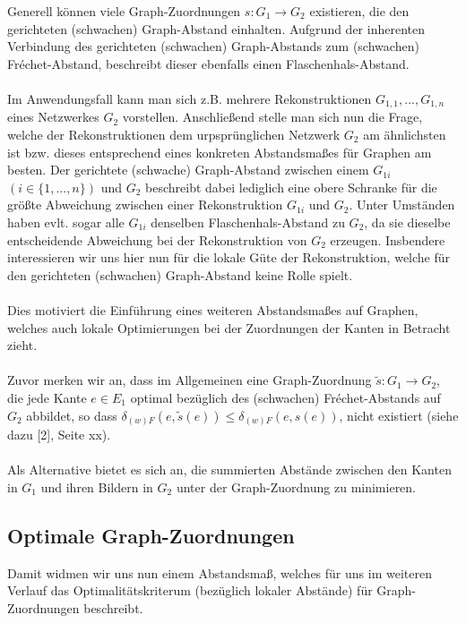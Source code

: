 \documentclass[a4paper, 12pt, twoside]{article}
\theoremstyle{Format1} %
\begin{document}
Generell können viele Graph-Zuordnungen $s: G_1 \to G_2$ existieren, die den gerichteten (schwachen) Graph-Abstand einhalten.
Aufgrund der inherenten Verbindung des gerichteten (schwachen) Graph-Abstands zum (schwachen) Fréchet-Abstand, beschreibt dieser ebenfalls einen Flaschenhals-Abstand.
\\
\\
Im Anwendungsfall kann man sich z.B. mehrere Rekonstruktionen $G_{1,1}, ..., G_{1,n}$ eines Netzwerkes $G_2$ vorstellen.
Anschließend stelle man sich nun die Frage, welche der Rekonstruktionen dem urpsprünglichen Netzwerk $G_2$ am ähnlichsten ist bzw. dieses entsprechend eines konkreten Abstandsmaßes
für Graphen am besten.
Der gerichtete (schwache) Graph-Abstand zwischen einem $G_{1i}$ $(i \in \{1,...,n\})$ und $G_2$ beschreibt dabei lediglich eine obere Schranke für die größte Abweichung zwischen
einer Rekonstruktion $G_{1i}$ und $G_2$.
Unter Umständen haben evlt. sogar alle $G_{1i}$ denselben Flaschenhals-Abstand zu $G_2$, da sie dieselbe entscheidende Abweichung bei der Rekonstruktion von $G_2$ erzeugen.
Insbendere interessieren wir uns hier nun für die lokale Güte der Rekonstruktion, welche für den gerichteten (schwachen) Graph-Abstand keine Rolle spielt.
\\
\\
Dies motiviert die Einführung eines weiteren Abstandsmaßes auf Graphen, welches auch lokale Optimierungen bei der Zuordnungen der Kanten in Betracht zieht.
\\
\\
Zuvor merken wir an, dass im Allgemeinen eine Graph-Zuordnung $\tilde{s}: G_1 \to G_2$, die jede Kante $e \in E_1$ optimal bezüglich des (schwachen)
Fréchet-Abstands auf $G_2$ abbildet, so dass $\delta_{(w)F}(e, \tilde{s}(e)) \leq \delta_{(w)F}(e, s(e))$, nicht existiert (siehe dazu [2], Seite xx).
\\
\\
Als Alternative bietet es sich an, die summierten Abstände zwischen den Kanten in $G_1$ und ihren Bildern in $G_2$ unter der Graph-Zuordnung zu minimieren.

\subsection{Optimale Graph-Zuordnungen}
Damit widmen wir uns nun einem Abstandsmaß, welches für uns im weiteren Verlauf das Optimalitätskriterum (bezüglich lokaler Abstände) für Graph-Zuordnungen beschreibt.
\end{document}
